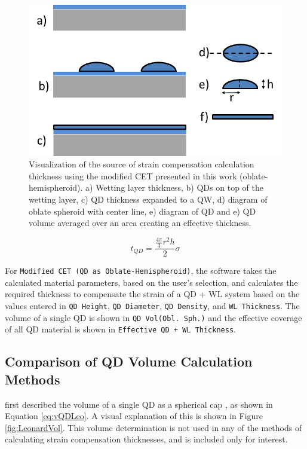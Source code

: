 \documentclass{article}
\begin{document}
\begin{figure}
	\includegraphics[width=0.95\linewidth]{QD_Polly_oblsph}
	\centering
	\caption{Visualization of the source of strain compensation calculation thickness using the modified CET presented in this work (oblate-hemispheroid). a) Wetting layer thickness, b) QDs on top of the wetting layer, c) QD thickness expanded to a QW, d) diagram of oblate spheroid with center line, e) diagram of QD and e) QD volume averaged over an area creating an effective thickness.}
	\label{fig:PollyVol}
\end{figure}

\begin{equation}
\label{eq:mCETOblSph}
t_{QD}=\frac{\frac{4\pi}{3}r^{2}h}{2}\sigma
\end{equation}

For \texttt{Modified CET (QD as Oblate-Hemispheroid)}, the software takes the calculated material parameters, based on the user's selection, and calculates the required thickness to compensate the strain of a QD + WL system based on the values entered in \texttt{QD Height}, \texttt{QD Diameter}, \texttt{QD Density}, and \texttt{WL Thickness}. The volume of a single QD is shown in \texttt{QD Vol(Obl. Sph.)} and the effective coverage of all QD material is shown in \texttt{Effective QD + WL Thickness}.
\FloatBarrier
\subsection{Comparison of QD Volume Calculation Methods}
\label{qdvolcompare}
\citeauthor{leonard_critical_1994} first described the volume of a single QD as a spherical cap \cite{leonard_critical_1994}, as shown in Equation \ref{eq:vQDLeo}. A visual explanation of this is shown in Figure \ref{fig:LeonardVol}. This volume determination is not used in any of the methods of calculating strain compensation thicknesses, and is included only for interest.
\end{document}
